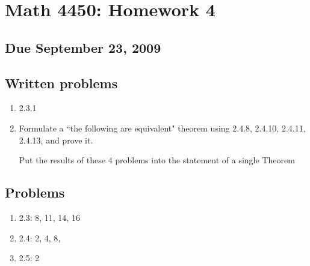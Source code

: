 \documentclass[11pt]{article}
\begin{document}
\section*{Math 4450:  Homework 4}
\subsection*{Due September 23, 2009}

\subsection*{Written problems}

\begin{enumerate}
\item  2.3.1
\item  Formulate a ``the following are equivalent" theorem using 2.4.8, 2.4.10, 2.4.11, 2.4.13, and prove it.

Put the results of these 4 problems into the statement of a single Theorem 
\end{enumerate}

\subsection*{Problems}

\begin{enumerate}
\item 2.3:  8, 11, 14, 16
\item 2.4: 2, 4, 8, 
\item 2.5: 2
\end{enumerate}
\end{document}
